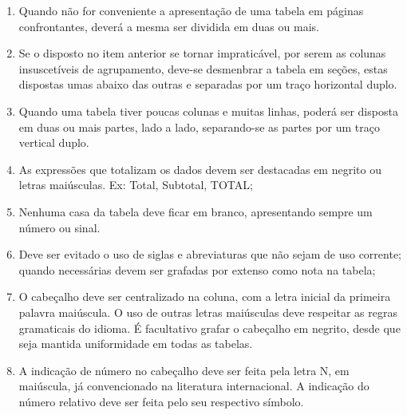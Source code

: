 \begin{enumerate}
\item Quando não for
conveniente a apresentação de uma tabela em páginas confrontantes,
deverá a mesma ser dividida em duas ou mais. 
\item Se o disposto
no item anterior se tornar impraticável, por serem as colunas
insuscetíveis de agrupamento, deve-se desmenbrar a tabela em
seções, estas dispostas umas abaixo das outras e separadas por um traço horizontal duplo. 
\item Quando uma tabela tiver poucas
colunas e muitas linhas, poderá ser disposta em duas ou mais
partes, lado a lado, separando-se as partes por um traço vertical
duplo.
\item As expressões que totalizam os dados devem ser destacadas em negrito ou letras maiúsculas. Ex: Total, Subtotal, TOTAL;
\item Nenhuma casa da tabela deve ficar em branco, apresentando sempre um número ou sinal.
\item Deve ser evitado o uso de siglas e abreviaturas que não sejam de uso corrente; quando necessárias devem ser grafadas por extenso como nota na tabela;
\item O cabeçalho deve ser centralizado na coluna, com a letra inicial da primeira palavra maiúscula. O uso de outras letras maiúsculas deve respeitar as regras gramaticais do idioma. É facultativo grafar o cabeçalho em negrito, desde que seja mantida uniformidade em todas as tabelas.
\item A indicação de número no cabeçalho deve ser feita pela letra N, em maiúscula, já convencionado na literatura internacional. A indicação do número relativo deve ser feita pelo seu respectivo símbolo.
\end{enumerate}






